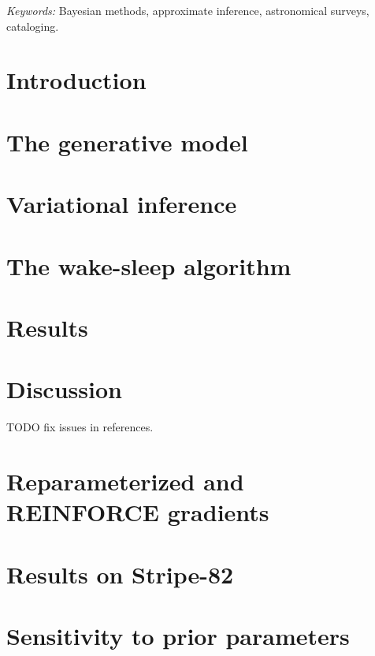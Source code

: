 \documentclass[12pt]{article}
\begin{document}
\noindent%
{\it Keywords:}  Bayesian methods, approximate inference, astronomical surveys, cataloging. 
\vfill

\newpage
{} %
\section{Introduction}
\label{sec:intro}


\section{The generative model}
\label{sec:gen_model}


\section{Variational inference}
\label{sec:var_inference}


\section{The wake-sleep algorithm}
\label{sec:wake_sleep}



% 

\section{Results}
\label{sec:results}




\section{Discussion}
\label{sec:discussion}


TODO fix issues in references. 



\appendix
\section{Reparameterized and REINFORCE gradients}
\label{sec:reparam_details}


\section{Results on Stripe-82}


\section{Sensitivity to prior parameters}


% 

% 
\end{document}
